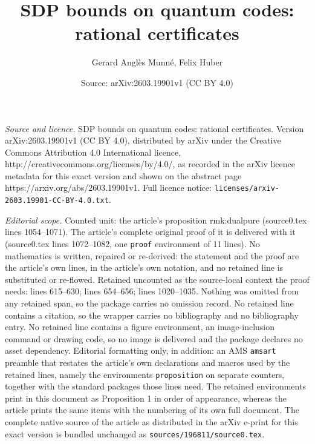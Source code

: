 \documentclass[10pt,a4paper]{amsart}
\title{SDP bounds on quantum codes: rational certificates}
\author{Gerard Angl\`es Munn\'e, Felix Huber}
\date{Source: arXiv:2603.19901v1 (CC BY 4.0)}
\begin{document}
\maketitle

\noindent\emph{Source and licence.} SDP bounds on quantum codes: rational certificates. Version arXiv:2603.19901v1 (CC BY 4.0), distributed by arXiv under the Creative Commons Attribution 4.0 International licence, http://creativecommons.org/licenses/by/4.0/, as recorded in the arXiv licence metadata for this exact version and shown on the abstract page https://arxiv.org/abs/2603.19901v1. Full licence notice: \texttt{licenses/arxiv-2603.19901-CC-BY-4.0.txt}.\par\smallskip

\noindent\textit{Editorial scope.} Counted unit: the article's proposition rmk:dualpure (source0.tex lines 1054--1071). The article's complete original proof of it is delivered with it (source0.tex lines 1072--1082, one \texttt{proof} environment of 11 lines). No mathematics is written, repaired or re-derived: the statement and the proof are the article's own lines, in the article's own notation, and no retained line is substituted or re-flowed.  Retained uncounted as the source-local context the proof needs: lines 615--630; lines 654--656; lines 1020--1035.  Nothing was omitted from any retained span, so the package carries no omission record.  No retained line contains a citation, so the wrapper carries no bibliography and no bibliography entry.  No retained line contains a figure environment, an image-inclusion command or drawing code, so no image is delivered and the package declares no asset dependency.  Editorial formatting only, in addition: an AMS \texttt{amsart} preamble that restates the article's own declarations and macros used by the retained lines, namely the environments \texttt{proposition} on separate counters, together with the standard packages those lines need.  The retained environments print in this document as Proposition 1 in order of appearance, whereas the article prints the same items with the numbering of its own full document.  The complete native source of the article as distributed in the arXiv e-print for this exact version is bundled unchanged as \texttt{sources/196811/source0.tex}.
\end{document}
